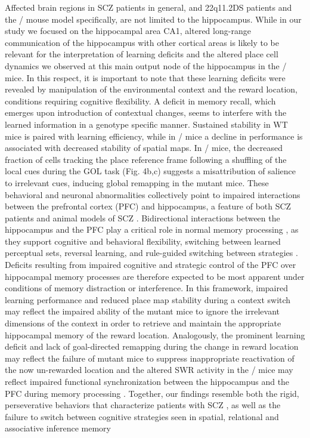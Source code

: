Affected brain regions in SCZ patients in general, and 22q11.2DS patients and the \df/ mouse model specifically, are not limited to the hippocampus. While in our study we focused on the hippocampal area CA1, altered long-range communication of the hippocampus with other cortical areas is likely to be relevant for the interpretation of learning deficits and the altered place cell dynamics we observed at this main output node of the hippocampus in the \df/ mice. In this respect, it is important to note that these learning deficits were revealed by manipulation of the environmental context and the reward location, conditions requiring cognitive flexibility. A deficit in memory recall, which emerges upon introduction of contextual changes, seems to interfere with the learned information in a genotype specific manner. Sustained stability in WT mice is paired with learning efficiency, while in \df/ mice a decline in performance is associated with decreased stability of spatial maps. In \df/ mice, the decreased fraction of cells tracking the place reference frame following a shuffling of the local cues during the GOL task (Fig. 4b,c) suggests a misattribution of salience to irrelevant cues, inducing global remapping in the mutant mice. These behavioral and neuronal abnormalities collectively point to impaired interactions between the prefrontal cortex (PFC) and hippocampus, a feature of both SCZ patients and animal models of SCZ \citep{Sigurdsson2015}\citep{Mukai2015}\citep{Sigurdsson2010}\citep{Tamura2016}. Bidirectional interactions between the hippocampus and the PFC play a critical role in normal memory processing \citep{Eichenbaum2017}\citep{Navawongse2013}\citep{Place2016}\citep{Preston2013}\citep{Simons2003}\citep{Miller2001}, as they support cognitive and behavioral flexibility, switching between learned perceptual sets, reversal learning, and rule-guided switching between strategies \citep{Ragozzino1999a}\citep{Ragozzino1999b}\citep{Birrell2000}\citep{Mala2015}\citep{Floresco2008}\citep{Rich2007}. Deficits resulting from impaired cognitive and strategic control of the PFC over hippocampal memory processes are therefore expected to be most apparent under conditions of memory distraction or interference. In this framework, impaired learning performance and reduced place map stability during a context switch may reflect the impaired ability of the mutant mice to ignore the irrelevant dimensions of the context in order to retrieve and maintain the appropriate hippocampal memory of the reward location. Analogously, the prominent learning deficit and lack of goal-directed remapping during the change in reward location may reflect the failure of mutant mice to suppress inappropriate reactivation of the now un-rewarded location and the altered SWR activity in the \df/ mice may reflect impaired functional synchronization between the hippocampus and the PFC during memory processing \citep{Jadhav2016}\citep{Jones2005}\citep{Peyrache2011}\citep{Siapas2005}\citep{Sigurdsson2010}\citep{Wierzynski2009}. Together, our findings resemble both the rigid, perseverative behaviors that characterize patients with SCZ \citep{Crider1997}\citep{Leeson2009}\citep{Morice1990}, as well as the failure to switch between cognitive strategies seen in spatial, relational and associative inference memory 